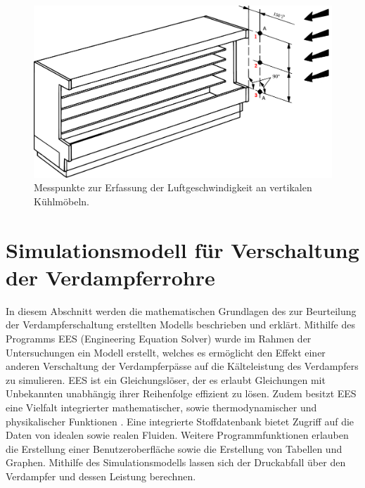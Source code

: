 \begin{figure}[h!tb]
\centering
\includegraphics[scale=.5]{Pictures/idc_meas2.pdf}
\caption{Messpunkte zur Erfassung der Luftgeschwindigkeit an vertikalen Kühlmöbeln.}
\label{fig:Messpunkte}
\end{figure}

\clearpage

\section{Simulationsmodell für Verschaltung der Verdampferrohre}
\label{sec:Simulationsmodell}

In diesem Abschnitt werden die mathematischen Grundlagen des zur Beurteilung der Verdampferschaltung erstellten Modells beschrieben und erklärt.
Mithilfe des Programms EES (Engineering Equation Solver) wurde im Rahmen der Untersuchungen ein Modell erstellt, welches es ermöglicht den Effekt einer anderen Verschaltung der Verdampferpässe auf die Kälteleistung des Verdampfers zu simulieren.  
EES ist ein Gleichungslöser, der es erlaubt Gleichungen mit Unbekannten unabhängig ihrer Reihenfolge effizient zu lösen. Zudem besitzt EES eine Vielfalt integrierter mathematischer, sowie thermodynamischer und physikalischer Funktionen \cite{Klein.2000}. Eine integrierte Stoffdatenbank bietet Zugriff auf die Daten von idealen sowie realen Fluiden. Weitere Programmfunktionen erlauben die Erstellung einer Benutzeroberfläche sowie die Erstellung von Tabellen und Graphen. \newline
Mithilfe des Simulationsmodells lassen sich der Druckabfall über den Verdampfer und dessen Leistung berechnen. 



